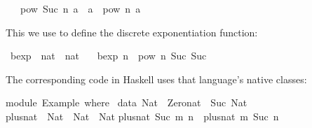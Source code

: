 \begin{isabellebody}
\ \ {}\ {}pow\ {}Suc\ n{}\ a\ {}\ a\ {}\ pow\ n\ a{}%
\endisatagquote
{\isafoldquote}%
%
\isadelimquote
%
\endisadelimquote
%
\begin{isamarkuptext}%
\noindent This we use to define the discrete exponentiation
  function:%
\end{isamarkuptext}%
\isamarkuptrue%
%
\isadelimquote
%
\endisadelimquote
%
\isatagquote
{}\isamarkupfalse%
\ bexp\ {}{}\ {}nat\ {}\ nat{}\ \isanewline
\ \ {}bexp\ n\ {}\ pow\ n\ {}Suc\ {}Suc\ {}{}{}{}%
\endisatagquote
{\isafoldquote}%
%
\isadelimquote
%
\endisadelimquote
%
\begin{isamarkuptext}%
\noindent The corresponding code in Haskell uses that language's
  native classes:%
\end{isamarkuptext}%
\isamarkuptrue%
%
\isadelimquotetypewriter
%
\endisadelimquotetypewriter
%
\isatagquotetypewriter
%
\begin{isamarkuptext}%
module\ Example\ where\ {}\isanewline
\isanewline
data\ Nat\ {}\ Zero{}nat\ {}\ Suc\ Nat{}\isanewline
\isanewline
plus{}nat\ {}{}\ Nat\ {}{}\ Nat\ {}{}\ Nat{}\isanewline
plus{}nat\ {}Suc\ m{}\ n\ {}\ plus{}nat\ m\ {}Suc\ n{}{}\isanewline

\end{isamarkuptext}
\end{isabellebody}
